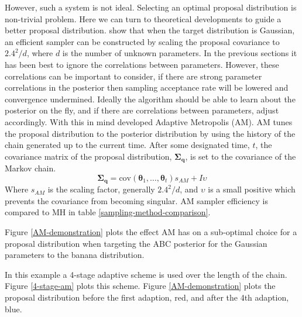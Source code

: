 However, such a system is not ideal. Selecting an optimal proposal distribution is non-trivial problem. Here we can turn to theoretical developments to guide a better proposal distribution. \citet{Gelman1996} show that when the target distribution is Gaussian, an efficient sampler can be constructed by scaling the proposal covariance to $2.4^2/d$, where $d$ is the number of unknown parameters. In the previous sections it has been best to ignore the correlations between parameters. However, these correlations can be important to consider, if there are strong parameter correlations in the posterior then sampling acceptance rate will be lowered and convergence undermined. Ideally the algorithm should be able to learn about the posterior on the fly, and if there are correlations between parameters, adjust accordingly. With this in mind \citet{haario2001} developed Adaptive Metropolis (AM). AM tunes the proposal distribution to the posterior distribution by using the history of the chain generated up to the current time. After some designated time, $t$, the covariance matrix of the proposal distribution, $\bm{\Sigma_q}$, is set to the covariance of the Markov chain. 
\begin{equation}
\bm{\Sigma_q} = \text{cov}(\bm{\theta}_1,\dots,\bm{\theta}_t)s_{AM} + I\upsilon
\end{equation}
Where $s_{AM}$ is the scaling factor, generally $2.4^2/d$, and $\upsilon$ is a small positive which prevents the covariance from becoming singular. AM sampler efficiency is compared to MH in table \ref{sampling-method-comparison}.\par

Figure \ref{AM-demonstration} plots the effect AM has on a sub-optimal choice for a proposal distribution when targeting the ABC posterior for the Gaussian parameters to the banana distribution.\par

In this example a 4-stage adaptive scheme is used over the length of the chain. Figure \ref{4-stage-am} plots this scheme. Figure \ref{AM-demonstration} plots the proposal distribution before the first adaption, red, and after the 4th adaption, blue. \\
\linebreak
\linebreak
\linebreak

